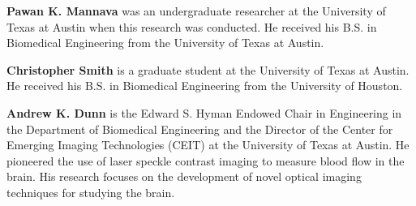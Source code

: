 \documentclass[12pt]{spieman}
\begin{document}
\begin{spacing}{2}
\vspace{2ex}\noindent\textbf{Pawan K. Mannava} was an undergraduate researcher at the University of Texas at Austin when this research was conducted. He received his B.S. in Biomedical Engineering from the University of Texas at Austin.

\vspace{2ex}\noindent\textbf{Christopher Smith} is a graduate student at the University of Texas at Austin. He received his B.S. in Biomedical Engineering from the University of Houston.

\vspace{2ex}\noindent\textbf{Andrew K. Dunn} is the Edward S. Hyman Endowed Chair in Engineering in the Department of Biomedical Engineering and the Director of the Center for Emerging Imaging Technologies (CEIT) at the University of Texas at Austin. He pioneered the use of laser speckle contrast imaging to measure blood flow in the brain. His research focuses on the development of novel optical imaging techniques for studying the brain.


\listoffigures
\listoftables


\end{spacing}
\end{document}
